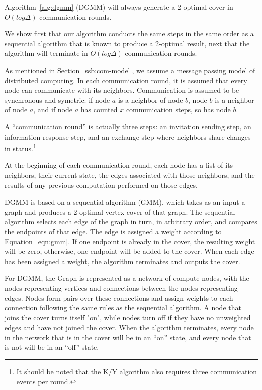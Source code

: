 \begin{thm}
  Algorithm~\ref{alg:dgmm} (DGMM) will always generate a 2-optimal cover in $O(log\Delta)$ communication rounds.
\label{thm:dgmm-term}
\end{thm}
\begin{smy}
We show first that our algorithm conducts the same steps in the same order as a sequential algorithm that is known to produce a 2-optimal result, next that the algorithm will terminate in $O(log\Delta)$ communication rounds.
\end{smy} 

\begin{note}
\label{not:com-model}
As mentioned in Section~\ref{ssb:com-model}, we assume a message passing model of distributed computing. In each communication round, it is assumed that every node can communicate with its neighbors. Communication is assumed to be synchronous and symetric: if node $a$ is a neighbor of node $b$, node $b$ is a neighbor of node $a$, and if node $a$ has counted $x$ communication steps, so has node $b$.

A ``communication round'' is actually three steps: an invitation sending step, an information response step, and an exchange step where neighbors share changes in status.\footnote{It should be noted that the K/Y algorithm also requires three communication events per round.} 
\end{note}
\begin{note}
\label{not:dgmm-local-info}
At the beginning of each communication round, each node has a list of its neighbors, their current state, the edges associated with those neighbors, and the results of any previous computation performed on those edges.
\end{note}
\begin{note}
\label{not:gmm-dgmm}
DGMM is based on a sequential algorithm (GMM), which takes as an input a graph and produces a 2-optimal vertex cover of that graph. The sequential algorithm selects each edge of the graph in turn, in arbitrary order, and compares the endpoints of that edge. The edge is assigned a weight according to Equation~\ref{eqn:gmm}. If one endpoint is already in the cover, the resulting weight will be zero, otherwise, one endpoint will be added to the cover. When each edge has been assigned a weight, the algorithm terminates and outputs the cover.

For DGMM, the Graph is represented as a network of compute nodes, with the nodes representing vertices and connections between the nodes representing edges. Nodes form pairs over these connections and assign weights to each connection following the same rules as the sequential algorithm. A node that joins the cover turns itself "on", while nodes turn off if they have no unweighted edges and have not joined the cover. When the algorithm terminates, every node in the network that is in the cover will be in an ``on'' state, and every node that is not will be in an ``off'' state.
\end{note}

